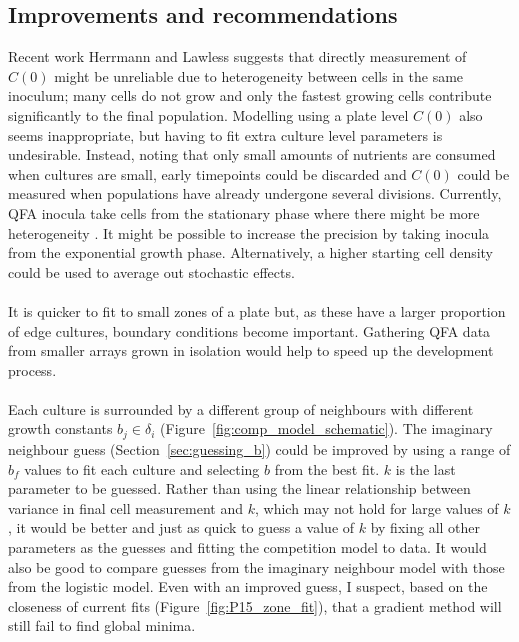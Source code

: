 \subsection{Improvements and recommendations}

Recent work Herrmann and Lawless suggests that directly measurement of
\(C(0)\) might be unreliable due to heterogeneity between cells in the
same inoculum; many cells do not grow and only the fastest growing
cells contribute significantly to the final population. Modelling
using a plate level \(C(0)\) also seems inappropriate, but having to
fit extra culture level parameters is undesirable. Instead, noting
that only small amounts of nutrients are consumed when cultures are
small, early timepoints could be discarded and \(C(0)\) could be
measured when populations have already undergone several
divisions. Currently, QFA inocula take cells from the stationary phase
where there might be more heterogeneity \citep{bergkessel2016}. It
might be possible to increase the precision by taking inocula from the
exponential growth phase. Alternatively, a higher starting cell
density could be used to average out stochastic effects.
\\\\
It is quicker to fit to small zones of a plate but, as these have a
larger proportion of edge cultures, boundary conditions become
important. Gathering QFA data from smaller arrays grown in isolation
would help to speed up the development process.
\\\\
Each culture is surrounded by a different group of neighbours with
different growth constants \(b_{j} \in \delta_{i}\)
(Figure~\ref{fig:comp_model_schematic}). The imaginary neighbour guess
(Section~\ref{sec:guessing_b}) could be improved by using a range of
\(b_{f}\) values to fit each culture and selecting \(b\) from the best
fit. \(k\) is the last parameter to be guessed. Rather than using the
linear relationship between variance in final cell measurement and
\(k\), which may not hold for large values of \(k\), it would be
better and just as quick to guess a value of \(k\) by fixing all other
parameters as the guesses and fitting the competition model to
data. It would also be good to compare guesses from the imaginary
neighbour model with those from the logistic model. Even with an
improved guess, I suspect, based on the closeness of current fits
(Figure~\ref{fig:P15_zone_fit}), that a gradient method will still
fail to find global minima.
